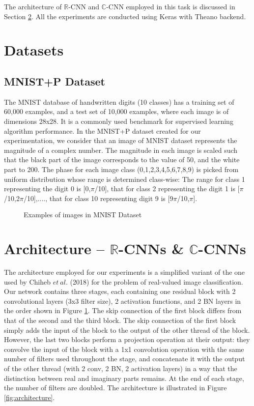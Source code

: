  The architecture of $\mathbb{R}$-CNN and $\mathbb{C}$-CNN employed in this task is discussed in Section \ref{archdesc}.  All the experiments are conducted using Keras \cite{chollet2015keras} with Theano \cite{theano} backend.
 
 
 \section{Datasets}\label{datasets}
 
 
 \subsection{MNIST+P Dataset}\label{data-mnistp}
 The MNIST database of handwritten digits (10 classes) has a training set of 60,000 examples, and a test set of 10,000 examples, where each image is of dimensions 28x28. It is a commonly used benchmark for supervised learning algorithm performance. In the MNIST+P dataset created for our experimentation, we consider that an image of MNIST dataset represents the magnitude of a complex number. The magnitude in each image is scaled such that the black part of the image corresponds to the value of 50, and the white part to 200. The phase for each image class (0,1,2,3,4,5,6,7,8,9) is picked from uniform distribution whose range is determined class-wise: The range for class 1 representing the digit 0 is [0,$\pi$/10], that for class 2 representing the digit 1 is [$\pi$/10,2$\pi$/10],...., that for class 10 representing digit 9 is [9$\pi$/10,$\pi$]. 
 
 \begin{figure}[htb]
 	\centering
 	\epsfxsize=7cm
 	{}\caption{Examples of images in MNIST Dataset \cite{mnistimage}}
 	\label{fig:blocks}
 \end{figure}
 
  
  
 \section{Architecture -- $\mathbb{R}$-CNNs \& $\mathbb{C}$-CNNs}\label{archdesc}
 The architecture employed for our experiments is a simplified variant of the one used by Chiheb $et \ al.$ (2018) \cite{trabelsi2018deep} for the problem of real-valued image classification. Our network contains three stages, each containing one residual block with 2 convolutional layers (3x3 filter size), 2 activation functions, and 2 BN layers in the order shown in Figure \ref{fig:blocks}. The skip connection of the first block differs from that of the second and the third block. The skip connection of the first block simply adds the input of the block to the output of the other thread of the block. However, the last two blocks perform a projection operation at their output: they convolve the input of the block with a 1x1 convolution operation with the same number of filters used throughout the stage, and concatenate it with the output of the other thread (with 2 conv, 2 BN, 2 activation layers) in a way that the distinction between real and imaginary parts remains. At the end of each stage, the number of filters are doubled. The architecture is illustrated in Figure \ref{fig:architecture}.
 
